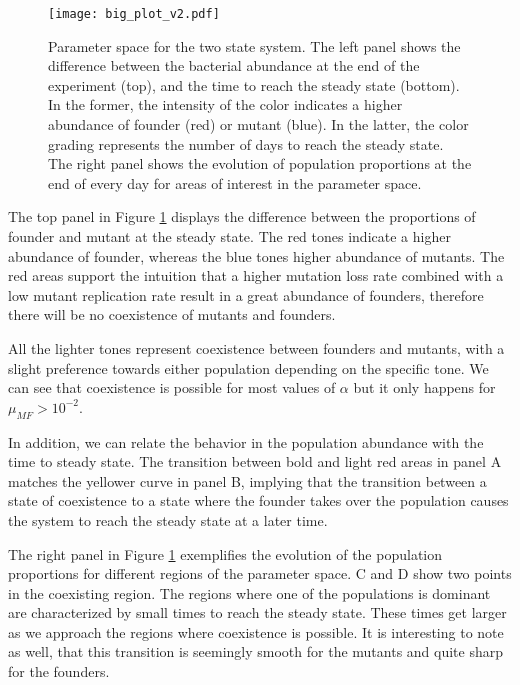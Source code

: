\documentclass[10pt,a4paper]{scrartcl}
\begin{document}
\begin{figure}[H]
	\centering
	\texttt{[image: big\_plot\_v2.pdf]}
	\caption{Parameter space for the two state system. The left panel shows the difference between the bacterial abundance at the end of the experiment (top), and the time to reach the steady state (bottom). In the former, the intensity of the color indicates a higher abundance of founder (red) or mutant (blue). In the latter, the color grading represents the number of days to reach the steady state. The right panel shows the evolution of population proportions at the end of every day for areas of interest in the parameter space.}%
	\label{fig:parameter_space_2st}
\end{figure}

The top panel in Figure \ref{fig:parameter_space_2st} displays the difference between the proportions of founder and mutant at the steady state. The red tones indicate a higher abundance of founder, whereas the blue tones higher abundance of mutants. The red areas support the intuition that a higher mutation loss rate combined with a low mutant replication rate result in a great abundance of founders, therefore there will be no coexistence of mutants and founders. %

All the lighter tones represent coexistence between founders and mutants, with a slight preference towards either population depending on the specific tone. We can see that coexistence is possible for most values of $\alpha$ but it only happens for $\mu_{MF}>10^{-2}$. %

In addition, we can relate the behavior in the population abundance with the time to steady state. The transition between bold and light red areas in panel A matches the yellower curve in panel B, implying that the transition between a state of coexistence to a state where the founder takes over the population causes the system to reach the steady state at a later time. %

The right panel in Figure \ref{fig:parameter_space_2st} exemplifies the evolution of the population proportions for different regions of the parameter space. C and D show two points in the coexisting region.
The regions where one of the populations is dominant are characterized by small times to reach the steady state. These times get larger as we approach the regions where coexistence is possible. It is interesting to note as well, that this transition is seemingly smooth for the mutants and quite sharp for the founders.%
\end{document}
